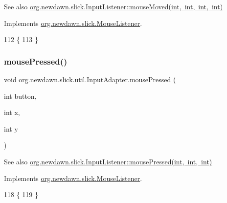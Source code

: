 \begin{DoxySeeAlso}{See also}
\mbox{\hyperlink{interfaceorg_1_1newdawn_1_1slick_1_1_mouse_listener_ad41216afc84f2c8d38f91e8b2d46bed9}{org.\+newdawn.\+slick.\+Input\+Listener\+::mouse\+Moved(int, int, int, int)}} 
\end{DoxySeeAlso}


Implements \mbox{\hyperlink{interfaceorg_1_1newdawn_1_1slick_1_1_mouse_listener_ad41216afc84f2c8d38f91e8b2d46bed9}{org.\+newdawn.\+slick.\+Mouse\+Listener}}.


\begin{DoxyCode}
112                                                                    \{
113     \}
\end{DoxyCode}
\mbox{\label{classorg_1_1newdawn_1_1slick_1_1util_1_1_input_adapter_a8c466a6d0e2479d535aa5f435fcc684d}} 
\subsubsection{\texorpdfstring{mouse\+Pressed()}{mousePressed()}}
{\footnotesize\ttfamily void org.\+newdawn.\+slick.\+util.\+Input\+Adapter.\+mouse\+Pressed (\begin{DoxyParamCaption}\item[{int}]{button,  }\item[{int}]{x,  }\item[{int}]{y }\end{DoxyParamCaption})\hspace{0.3cm}{\ttfamily [inline]}}

\begin{DoxySeeAlso}{See also}
\mbox{\hyperlink{interfaceorg_1_1newdawn_1_1slick_1_1_mouse_listener_aeca4c21a38aa31c408f3daf6f86c0925}{org.\+newdawn.\+slick.\+Input\+Listener\+::mouse\+Pressed(int, int, int)}} 
\end{DoxySeeAlso}


Implements \mbox{\hyperlink{interfaceorg_1_1newdawn_1_1slick_1_1_mouse_listener_aeca4c21a38aa31c408f3daf6f86c0925}{org.\+newdawn.\+slick.\+Mouse\+Listener}}.


\begin{DoxyCode}
118                                                        \{
119     \}
\end{DoxyCode}
\mbox{\label{classorg_1_1newdawn_1_1slick_1_1util_1_1_input_adapter_a29e726b1c4d1734882fc38b4c9ecacdb}} 
